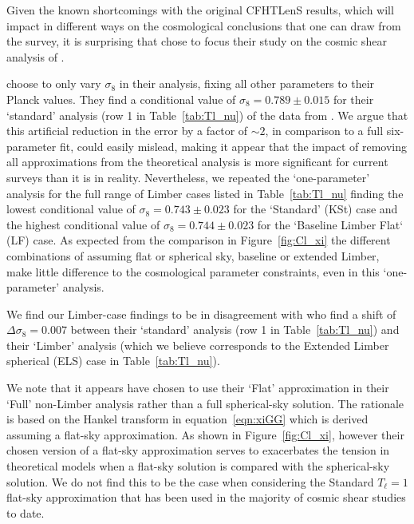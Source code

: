 Given the known shortcomings with the original CFHTLenS results, which will impact in different ways on the cosmological conclusions that one can draw from the survey, it is surprising that \citet{kitching/etal:2016} chose to focus their study on the cosmic shear analysis of \citet{kilbinger/etal:2013}.  

\citet{kitching/etal:2016} choose to only vary $\sigma_8$ in their analysis, fixing all other parameters to their Planck values. They find a conditional value of $\sigma_8 = 0.789 \pm 0.015$ for their `standard' analysis (row 1 in Table~\ref{tab:Tl_nu}) of the data from \citet{kilbinger/etal:2013}.    We argue that this artificial reduction in the error by a factor of $\sim 2$, in comparison to a full six-parameter fit, could easily mislead, making it appear that the impact of removing all approximations from the theoretical analysis is more significant for current surveys than it is in reality.  Nevertheless, we repeated the `one-parameter' analysis for the full range of Limber cases listed in Table~\ref{tab:Tl_nu} finding the lowest conditional value of $\sigma_8 = 0.743 \pm 0.023$ for the `Standard' (KSt) case and the highest conditional value of $\sigma_8 = 0.744 \pm 0.023$ for the `Baseline Limber Flat` (LF) case.  As expected from the comparison in Figure~\ref{fig:Cl_xi} the different combinations of assuming flat or spherical sky, baseline or extended Limber, make little difference to the cosmological parameter constraints, even in this `one-parameter' analysis.    

We find our Limber-case findings to be in disagreement with \citet{kitching/etal:2016} who find a shift of $\Delta \sigma_8 = 0.007$ between their `standard' analysis (row 1 in Table~\ref{tab:Tl_nu}) and their `Limber' analysis (which we believe corresponds to the Extended Limber spherical (ELS) case in Table~\ref{tab:Tl_nu}).  

We note that it appears \citet{kitching/etal:2016} have chosen to use their `Flat' approximation in their `Full' non-Limber analysis rather than a full spherical-sky solution.  The rationale is based on the Hankel transform in equation~\ref{eqn:xiGG} which is derived assuming a flat-sky approximation.  As shown in Figure~\ref{fig:Cl_xi}, however their chosen version of a flat-sky approximation serves to exacerbates the tension in theoretical models when a flat-sky solution is compared with the spherical-sky solution. We do not find this to be the case when considering the Standard $T_\ell = 1$ flat-sky approximation that has been used in the majority of cosmic shear studies to date.

